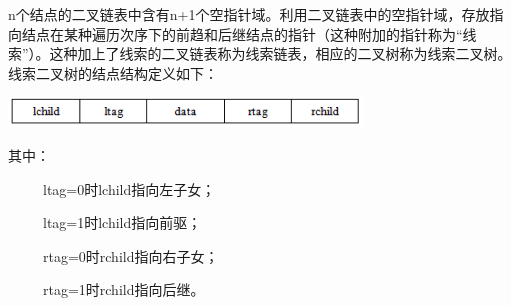 {n个结点的二叉链表中含有n+1个空指针域。利用二叉链表中的空指针域，存放指向结点在某种遍历次序下的前趋和后继结点的指针（这种附加的指针称为``线索''）。{这种加上了线索的二叉链表称为线索链表，相应的二叉树称为线索二叉树。}线索二叉树的结点结构定义如下：\\
}

\includegraphics[width=3.70833in,height=0.31250in]{png-jpeg-pics/2C7D92B8C8B6DFA32271B9299B2CFE31.png}

{其中：}

{~ ~ ~ ltag=0时lchild指向左子女；}

{~ ~ ~ ltag=1时lchild指向前驱；}

{~ ~ ~ rtag=0时rchild指向右子女；}

{~ ~ ~ rtag=1时rchild指向后继。}
